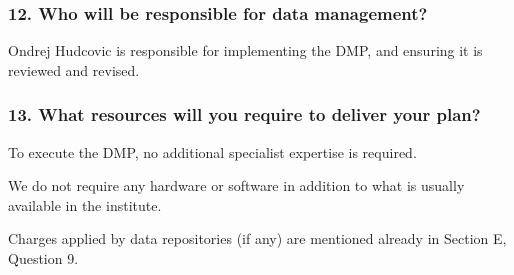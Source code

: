 \documentclass[
]{article}
\begin{document}
\hypertarget{q-dm-responsible}{}
\hypertarget{who-will-be-responsible-for-data-management}{%
\subsubsection{12. Who will be responsible for data
management?}\label{who-will-be-responsible-for-data-management}}

Ondrej Hudcovic is responsible for implementing the DMP, and ensuring it
is reviewed and revised.

\hypertarget{q-required-resources}{}
\hypertarget{what-resources-will-you-require-to-deliver-your-plan}{%
\subsubsection{13. What resources will you require to deliver your
plan?}\label{what-resources-will-you-require-to-deliver-your-plan}}

To execute the DMP, no additional specialist expertise is required.

We do not require any hardware or software in addition to what is
usually available in the institute.

Charges applied by data repositories (if any) are mentioned already in
Section E, Question 9.
\end{document}
